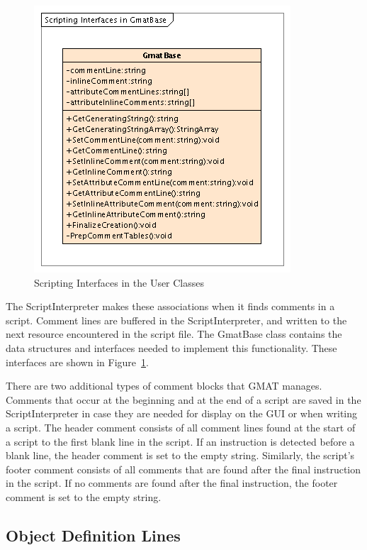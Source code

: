 \begin{figure}[htb]
\begin{center}
\includegraphics[220,229]{Images/ScriptingInterfacesinGmatBase.png}
\caption{\label{figure:GmatBaseCommentInterface}Scripting Interfaces in the User Classes}
\end{center}
\end{figure}

The ScriptInterpreter makes these associations when it finds comments in a script.  Comment lines
are buffered in the ScriptInterpreter, and written to the next resource encountered in the script
file.  The GmatBase class contains the data structures and interfaces needed to implement this
functionality.  These interfaces are shown in Figure~\ref{figure:GmatBaseCommentInterface}.

There are two additional types of comment blocks that GMAT manages.  Comments that occur at the
beginning and at the end of a script are saved in the ScriptInterpreter in case they are needed for
display on the GUI or when writing a script.  The header comment consists of all comment lines found
at the start of a script to the first blank line in the script. If an instruction is detected before
a blank line, the header comment is set to the empty string.  Similarly, the script's footer comment
consists of all comments that are found after the final instruction in the script.  If no comments
are found after the final instruction, the footer comment is set to the empty string.

\subsection{\label{section:ParsingObjectDefinitions}Object Definition Lines}


